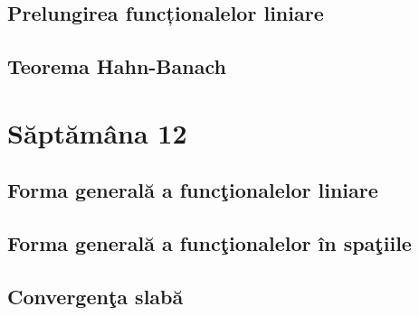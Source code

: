 \documentclass[a4paper,12pt]{article}
\theoremstyle{change}
\begin{document}

\subsection{Prelungirea funcționalelor liniare}

\subsection{Teorema Hahn-Banach}

\section{Săptămâna 12}


\subsection{Forma generală a funcţionalelor liniare}


\subsection{Forma generală a funcţionalelor în spaţiile }


\subsection{Convergenţa slabă}
\end{document}
